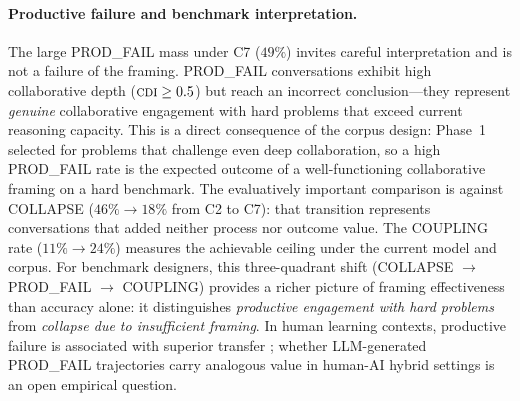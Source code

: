 \documentclass{article}
\newcommand{\CDI}{\textsc{cdi}}
\begin{document}
\paragraph{Productive failure and benchmark interpretation.}
The large PROD\_FAIL mass under C7 ($49\%$) invites careful
interpretation and is not a failure of the framing. PROD\_FAIL
conversations exhibit high collaborative depth ($\CDI \geq 0.5$) but
reach an incorrect conclusion---they represent \emph{genuine}
collaborative engagement with hard problems that exceed current
reasoning capacity. This is a direct consequence of the corpus design:
Phase~1 selected for problems that challenge even deep collaboration,
so a high PROD\_FAIL rate is the expected outcome of a well-functioning
collaborative framing on a hard benchmark. The evaluatively important
comparison is against COLLAPSE ($46\% \to 18\%$ from C2 to C7): that
transition represents conversations that added neither process nor
outcome value. The COUPLING rate ($11\% \to 24\%$) measures the
achievable ceiling under the current model and corpus. For benchmark
designers, this three-quadrant shift (COLLAPSE $\to$ PROD\_FAIL
$\to$ COUPLING) provides a richer picture of framing effectiveness
than accuracy alone: it distinguishes \emph{productive engagement with
hard problems} from \emph{collapse due to insufficient framing}.
In human learning contexts, productive failure is associated with
superior transfer \citep{kapur2016examining, schwartz1998time};
whether LLM-generated PROD\_FAIL trajectories carry analogous value
in human-AI hybrid settings is an open empirical question.
\end{document}
